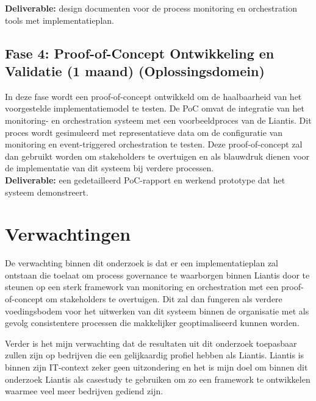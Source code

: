 \textbf{Deliverable:} design documenten voor de process monitoring en orchestration tools met implementatieplan.

\subsection{Fase 4: Proof-of-Concept Ontwikkeling en Validatie (1 maand) (Oplossingsdomein)}

In deze fase wordt een proof-of-concept ontwikkeld om de haalbaarheid van het voorgestelde implementatiemodel te testen. De PoC omvat de integratie van het monitoring- en orchestration systeem met een voorbeeldproces van de Liantis. Dit proces wordt gesimuleerd met representatieve data om de configuratie van monitoring en event-triggered orchestration te testen. Deze proof-of-concept zal dan gebruikt worden om stakeholders te overtuigen en als blauwdruk dienen voor de implementatie van dit systeem bij verdere processen. \\

\textbf{Deliverable:} een gedetailleerd PoC-rapport en werkend prototype dat het systeem demonstreert.

\section{Verwachtingen}%
\label{sec:verwachtingen}
De verwachting binnen dit onderzoek is dat er een implementatieplan zal ontstaan die toelaat om process governance te waarborgen binnen Liantis door te steunen op een sterk framework van monitoring en orchestration met een proof-of-concept om stakeholders te overtuigen. Dit zal dan fungeren als verdere voedingsbodem voor het uitwerken van dit systeem binnen de organisatie met als gevolg consistentere processen die makkelijker geoptimaliseerd kunnen worden.

Verder is het mijn verwachting dat de resultaten uit dit onderzoek toepasbaar zullen zijn op bedrijven die een gelijkaardig profiel hebben als Liantis. Liantis is binnen zijn IT-context zeker geen uitzondering en het is mijn doel om binnen dit onderzoek Liantis als casestudy te gebruiken om zo een framework te ontwikkelen waarmee veel meer bedrijven gediend zijn.

